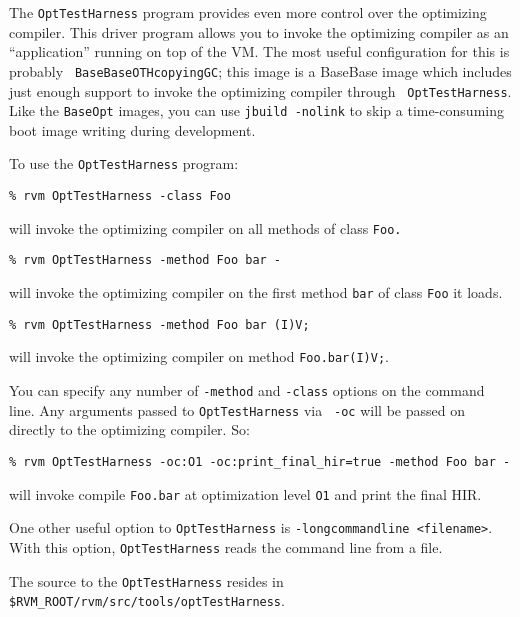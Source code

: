 The {\tt OptTestHarness} program provides even more control over the
optimizing compiler.  This driver program allows you to invoke the
optimizing compiler as an ``application'' running on top of the VM.
The most useful configuration for this is probably {\tt
BaseBaseOTHcopyingGC}; this image is a BaseBase image which includes just
enough support to invoke the optimizing compiler through {\tt
OptTestHarness}.  Like the {\tt BaseOpt} images, you can use {\tt jbuild
-nolink} to skip a time-consuming boot image writing during development.

To use the {\tt OptTestHarness} program:
\begin{verbatim}
% rvm OptTestHarness -class Foo
\end{verbatim}
will invoke the optimizing compiler on all methods of class {\tt Foo.}

\begin{verbatim}
% rvm OptTestHarness -method Foo bar - 
\end{verbatim}
will invoke the optimizing compiler on the first method {\tt bar} of class
{\tt Foo} it loads.

\begin{verbatim}
% rvm OptTestHarness -method Foo bar (I)V; 
\end{verbatim} 
will invoke the optimizing compiler on method {\tt Foo.bar(I)V;}.

You can specify any number of {\tt -method} and {\tt -class} options on
the command line.  Any arguments passed to {\tt OptTestHarness} via {\tt
-oc} will be passed on directly to the optimizing compiler.  So:

\begin{verbatim}
% rvm OptTestHarness -oc:O1 -oc:print_final_hir=true -method Foo bar -
\end{verbatim} 
will invoke compile {\tt Foo.bar} at optimization level {\tt O1} and print
the final HIR.

One other useful option to {\tt OptTestHarness} is {\tt -longcommandline
<filename>}. With this option, {\tt OptTestHarness} reads the command line
from a file.

The source to the {\tt OptTestHarness} resides in 
{\tt \$RVM\_ROOT/rvm/src/tools/optTestHarness}.
